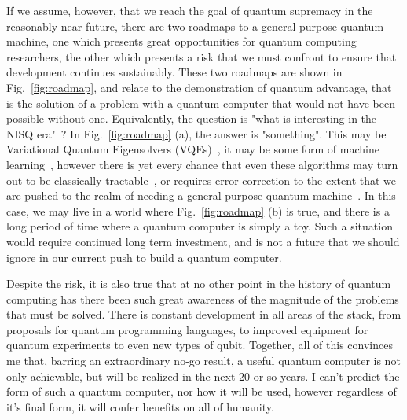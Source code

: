 If we assume, however, that we reach the goal of quantum supremacy in the reasonably near future, there are two roadmaps to a general purpose quantum machine, one which
presents great opportunities for quantum computing researchers, the other which presents a risk that we must confront to ensure that development continues sustainably.
These two roadmaps are shown in Fig.~\ref{fig:roadmap}, and relate to the demonstration of quantum advantage, that is the solution of a problem with a quantum computer
that would not have been possible without one. Equivalently, the question is "what is interesting in the NISQ era"~\cite{Preskill2018quantumcomputingin}? In Fig.~\ref{fig:roadmap}
(a), the answer is "something". This may be Variational Quantum Eigensolvers (VQEs)~\cite{nature23879}, it may be some form of machine learning~\cite{PhysRevLett.121.040502},
however there is yet every chance that even these algorithms may turn out to be classically tractable~\cite{Tang:2019:QCA:3313276.3316310,10.1038/nphys3272}, or requires
error correction to the extent that we are pushed to the realm of needing a general purpose quantum machine~\cite{Reiher7555}. In this case, we may live in a world where
Fig.~\ref{fig:roadmap} (b) is true, and there is a long period of time where a quantum computer is simply a toy. Such a situation would require continued long term investment,
and is not a future that we should ignore in our current push to build a quantum computer.

Despite the risk, it is also true that at no other point in the history of quantum computing has there been such great awareness of the magnitude of the problems
that must be solved. There is constant development in all areas of the stack, from proposals for quantum programming languages, to improved equipment for quantum
experiments to even new types of qubit. Together, all of this convinces me that, barring an extraordinary no-go result, a useful quantum computer is not only
achievable, but will be realized in the next 20 or so years. I can't predict the form of such a quantum computer, nor how it will be used, however regardless of
it's final form, it will confer benefits on all of humanity.
